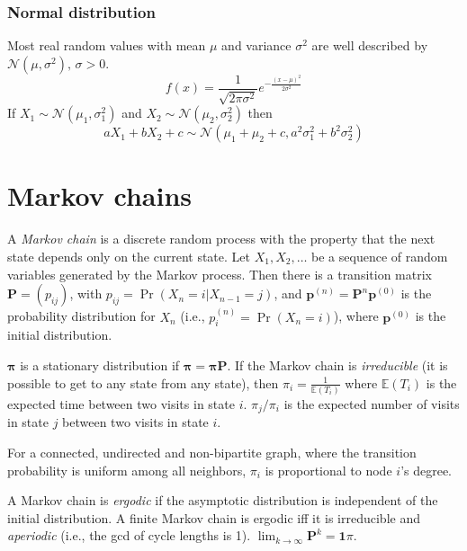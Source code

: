 \subsubsection{Normal distribution}
Most real random values with mean $\mu$ and variance $\sigma^2$ are well described by $\mathcal{N}(\mu,\sigma^2),\,\sigma>0$.
\[ f(x) = \frac{1}{\sqrt{2\pi\sigma^2}}e^{-\frac{(x-\mu)^2}{2\sigma^2}} \]
If $X_1 \sim \mathcal{N}(\mu_1,\sigma_1^2)$ and $X_2 \sim \mathcal{N}(\mu_2,\sigma_2^2)$ then
\[ aX_1 + bX_2 + c \sim \mathcal{N}(\mu_1+\mu_2+c,a^2\sigma_1^2+b^2\sigma_2^2) \]

\section{Markov chains}
A \emph{Markov chain} is a discrete random process with the property that the next state depends only on the current state.
Let $X_1,X_2,\ldots$ be a sequence of random variables generated by the Markov process.
Then there is a transition matrix $\mathbf{P} = (p_{ij})$, with $p_{ij} = \Pr(X_n = i | X_{n-1} = j)$,
and $\mathbf{p}^{(n)} = \mathbf P^n \mathbf p^{(0)}$ is the probability distribution for $X_n$ (i.e., $p^{(n)}_i = \Pr(X_n = i)$),
where $\mathbf{p}^{(0)}$ is the initial distribution.

$\mathbf{\pi}$ is a stationary distribution if $\mathbf{\pi} = \mathbf{\pi P}$.
If the Markov chain is \emph{irreducible} (it is possible to get to any state from any state),
then $\pi_i = \frac{1}{\mathbb{E}(T_i)}$ where $\mathbb{E}(T_i)$  is the expected time between two visits in state $i$.
$\pi_j/\pi_i$ is the expected number of visits in state $j$ between two visits in state $i$.

For a connected, undirected and non-bipartite graph, where the transition probability is uniform among all neighbors, $\pi_i$ is proportional to node $i$'s degree.

A Markov chain is \emph{ergodic} if the asymptotic distribution is independent of the initial distribution.
A finite Markov chain is ergodic iff it is irreducible and \emph{aperiodic} (i.e., the gcd of cycle lengths is 1).
$\lim_{k\rightarrow\infty}\mathbf{P}^k = \mathbf{1}\pi$.

